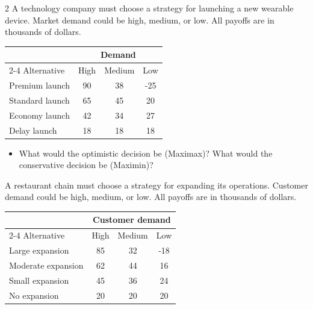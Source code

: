 \begin{multicols}{2}
		\newpage
		A technology company must choose a strategy for launching a new wearable device. Market demand could be high, medium, or low. All payoffs are in thousands of dollars.
		
		\begin{center}
			\renewcommand{\arraystretch}{1.3}
			\small
			\begin{tabular}{lccc}
				\toprule
				& \multicolumn{3}{c}{Demand} \\
				\cmidrule(lr){2-4}
				Alternative & High & Medium & Low \\
				\midrule
				Premium launch & 90 & 38 & -25 \\
				Standard launch & 65 & 45 & 20 \\
				Economy launch & 42 & 34 & 27 \\
				Delay launch & 18 & 18 & 18 \\
				\bottomrule
			\end{tabular}
		\end{center}
		
		
		\begin{itemize}
			\item [\textbf{(C4)}] What would the optimistic decision be (Maximax)? What would the conservative decision be (Maximin)? 
		\end{itemize}
		
		
		A restaurant chain must choose a strategy for expanding its operations. Customer demand could be high, medium, or low. All payoffs are in thousands of dollars.
		
		\begin{center}
			\renewcommand{\arraystretch}{1.3}
			\small
			\begin{tabular}{lccc}
				\toprule
				& \multicolumn{3}{c}{Customer demand} \\
				\cmidrule(lr){2-4}
				Alternative & High & Medium & Low \\
				\midrule
				Large expansion & 85 & 32 & -18 \\
				Moderate expansion & 62 & 44 & 16 \\
				Small expansion & 45 & 36 & 24 \\
				No expansion & 20 & 20 & 20 \\
				\bottomrule
			\end{tabular}
		\end{center}
		

\end{multicols}
